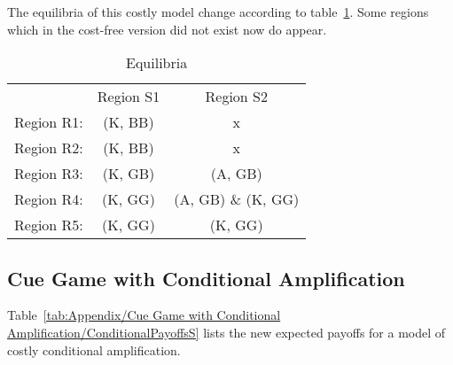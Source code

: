 \documentclass[a4paper,12pt]{article}
\numberwithin{equation}{section}
\begin{document}
The equilibria of this costly model change according to table~\ref{tab:Appendix/Cue Game with Unconditional Amplification/Equilibria}. Some regions which in the cost-free version did not exist now do appear.

\begin{table}[h]
\begin{center}
\begin{tabular}{lcc}
 & Region S1 & Region S2\\
Region R1: & (K, BB) & x\\
Region R2: & (K, BB) & x\\
Region R3: & (K, GB) & (A, GB)\\
Region R4: & (K, GG) & (A, GB) \& (K, GG)\\
Region R5: & (K, GG) & (K, GG)
\end{tabular}
\end{center}
\caption{Equilibria}
\label{tab:Appendix/Cue Game with Unconditional Amplification/Equilibria}
\end{table}

\newpage \clearpage


\subsection{Cue Game with Conditional Amplification}
\label{sec:Appendix/Cue Game with Conditional Amplification}

Table~\ref{tab:Appendix/Cue Game with Conditional Amplification/ConditionalPayoffsS} lists the new expected payoffs for a model of costly conditional amplification.
\end{document}
